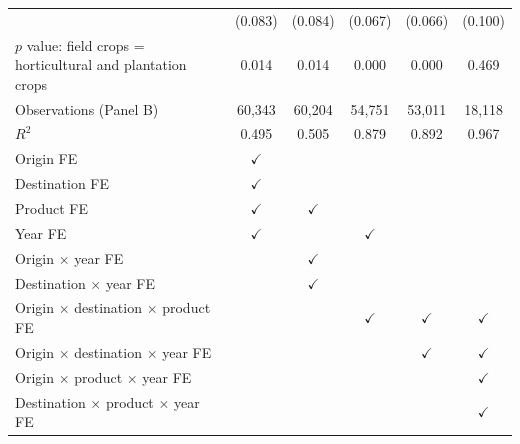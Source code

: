 \begin{tabular}{l*{5}{c}}
 & (0.083) & (0.084) & (0.067) & (0.066) & (0.100) \\
$p$ value: field crops = horticultural and plantation crops & 0.014 & 0.014 & 0.000 & 0.000 & 0.469 \\
Observations (Panel B) & 60,343 & 60,204 & 54,751 & 53,011 & 18,118 \\
$R^2$ & 0.495 & 0.505 & 0.879 & 0.892 & 0.967 \\
\midrule
Origin FE & $\checkmark$ &  &  &  &  \\
Destination FE & $\checkmark$ &  &  &  &  \\
Product FE & $\checkmark$ & $\checkmark$ &  &  &  \\
Year FE & $\checkmark$ &  & $\checkmark$ &  &  \\
Origin $\times$ year FE &  & $\checkmark$ &  &  &  \\
Destination $\times$ year FE &  & $\checkmark$ &  &  &  \\
Origin $\times$ destination $\times$ product FE &  &  & $\checkmark$ & $\checkmark$ & $\checkmark$ \\
Origin $\times$ destination $\times$ year FE &  &  &  & $\checkmark$ & $\checkmark$ \\
Origin $\times$ product $\times$ year FE &  &  &  &  & $\checkmark$ \\
Destination $\times$ product $\times$ year FE &  &  &  &  & $\checkmark$ \\
\bottomrule
\end{tabular}

